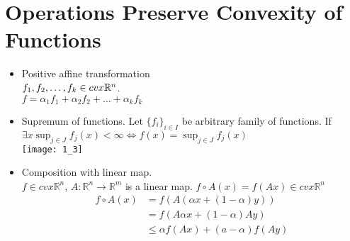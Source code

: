\documentclass[11pt,fleqn]{book} %
\def\R{\mathbb{R}}
\begin{document}
\section{Operations Preserve Convexity of Functions}
\begin{itemize}
\item Positive affine transformation \\
$f_1,f_2,\ldots,f_k \in \space cvx \R^n$.\\
$f = \alpha_1 f_1 + \alpha_2 f_2 + \ldots + \alpha_k f_k$
\item Supremum of functions. Let $\{ f_i \}_{i \in I}$ be arbitrary family of functions. If $\exists x \sup_{j \in J} f_j(x) < \infty \Leftrightarrow f(x) = \sup_{j \in J} f_j(x) $\\
\texttt{[image: 1\_3]}
\item Composition with linear map.\\
$f \in cvx \R^n$, $A:\R^n \to \R^m$ is a linear map.
$f \circ A (x) = f(Ax) \in cvx \R^n$\\
\begin{align*}
f \circ A (x) & = f(A(\alpha x + (1-\alpha) y)) \\
& = f(A \alpha x + (1-\alpha) A y) \\
& \le \alpha f(Ax) + (a - \alpha) f(Ay)
\end{align*}
\end{itemize}
\end{document}
